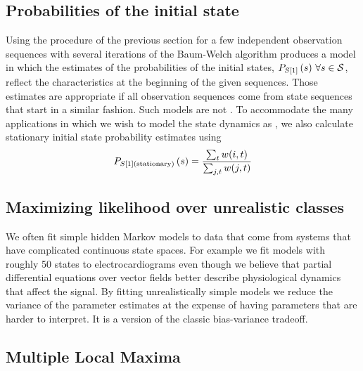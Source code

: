 \subsection{Probabilities of the initial state}
\label{sec:Ps0}

Using the procedure of the previous section for a few independent
observation sequences with several iterations of the Baum-Welch
algorithm produces a model in which the estimates of the probabilities
of the initial states, $P_{\ti{S}{1}} \left(s \right)\,\forall s \in
\states$, reflect the characteristics at the beginning of the given
sequences.  Those estimates are appropriate if all observation
sequences come from state sequences that start in a similar fashion.
Such models are not .  To accommodate the many
applications in which we wish to model the state dynamics as
, we also calculate stationary initial state probability
estimates using
\begin{equation}
  \label{eq:Ps0stationary}
  P_{{S}{[1]}(\text{stationary})} \left(s \right) =
  \frac{\sum_{t}w(i,t)}{\sum_{j,t}w(j,t)}
\end{equation}



\subsection{Maximizing likelihood over unrealistic classes}
\label{sec:incredible}

We often fit simple hidden Markov models to data that come from
systems that have complicated continuous state spaces.  For example we
fit models with roughly 50 states to electrocardiograms even though we
believe that partial differential equations over vector fields better
describe physiological dynamics that affect the signal.  By fitting
unrealistically simple models we reduce the variance of the parameter
estimates at the expense of having parameters that are harder to
interpret.  It is a version of the classic  bias-variance tradeoff.

\subsection{Multiple Local Maxima}
\label{sec:MultiMax}

